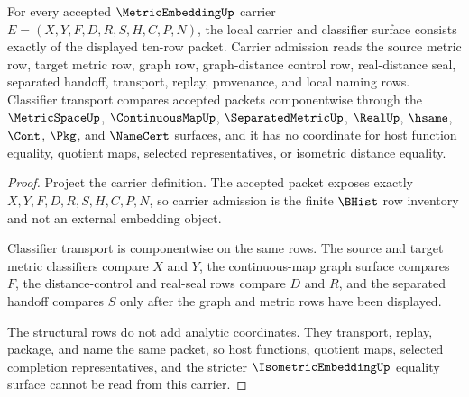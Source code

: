 \begin{theorem}
\label{thm:metric-embedding-carrier-classifier-obligations}
For every accepted $\MetricEmbeddingUp$ carrier $E=(X,Y,F,D,R,S,H,C,P,N)$, the local carrier and classifier surface consists exactly of the displayed ten-row packet. Carrier admission reads the source metric row, target metric row, graph row, graph-distance control row, real-distance seal, separated handoff, transport, replay, provenance, and local naming rows. Classifier transport compares accepted packets componentwise through the $\MetricSpaceUp$, $\ContinuousMapUp$, $\SeparatedMetricUp$, $\RealUp$, $\hsame$, $\Cont$, $\Pkg$, and $\NameCert$ surfaces, and it has no coordinate for host function equality, quotient maps, selected representatives, or isometric distance equality.
\end{theorem}
\begin{proof}
Project the carrier definition. The accepted packet exposes exactly $X,Y,F,D,R,S,H,C,P,N$, so carrier admission is the finite $\BHist$ row inventory and not an external embedding object.

Classifier transport is componentwise on the same rows. The source and target metric classifiers compare $X$ and $Y$, the continuous-map graph surface compares $F$, the distance-control and real-seal rows compare $D$ and $R$, and the separated handoff compares $S$ only after the graph and metric rows have been displayed.

The structural rows do not add analytic coordinates. They transport, replay, package, and name the same packet, so host functions, quotient maps, selected completion representatives, and the stricter $\IsometricEmbeddingUp$ equality surface cannot be read from this carrier.
\end{proof}

